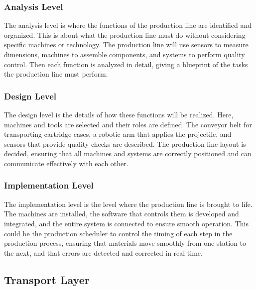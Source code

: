 \subsubsection{Analysis Level}
The analysis level is where the functions of the production line are identified and organized. This is about what the production line must do without considering specific machines or technology. The production line will use sensors to measure dimensions, machines to assemble components, and systems to perform quality control. Then each function is analyzed in detail, giving a blueprint of the tasks the production line must perform.

\subsubsection{Design Level}
The design level is the details of how these functions will be realized. Here, machines and tools are selected and their roles are defined. The conveyor belt for transporting cartridge cases, a robotic arm that applies the projectile, and sensors that provide quality checks are described.
The production line layout is decided, ensuring that all machines and systems are correctly positioned and can communicate effectively with each other.

\subsubsection{Implementation Level}
The implementation level is the level where the production line is brought to life. The machines are installed, the software that controls them is developed and integrated, and the entire system is connected to ensure smooth operation. This could be the production scheduler to control the timing of each step in the production process, ensuring that materials move smoothly from one station to the next, and that errors are detected and corrected in real time.





\subsection{Transport Layer} %

